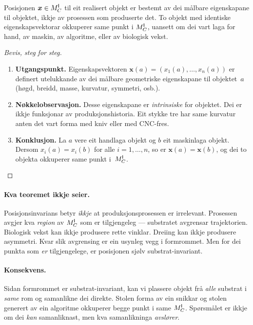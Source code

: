 \begin{satmark}[Posisjonsinvarians]\label{thm:L.7.2}
Posisjonen $\bm{x} \in M^{\mathsf{I}}_C$ til eit realisert objekt er bestemt
av dei målbare eigenskapane til objektet, ikkje av prosessen som
produserte det. To objekt med identiske eigenskapsvektorar
okkuperer same punkt i $M^{\mathsf{I}}_C$, uansett om dei vart laga for hand,
av maskin, av algoritme, eller av biologisk vekst.
\end{satmark}

\begin{proof}[Bevis, steg for steg]
\begin{enumerate}
  \item \textbf{Utgangspunkt.}\;
    Eigenskapsvektoren $\bm{x}(a) = (x_1(a), \ldots, x_n(a))$ er
    definert utelukkande av dei målbare geometriske eigenskapane
    til objektet~$a$ (høgd, breidd, masse, kurvatur, symmetri, osb.).
  \item \textbf{Nøkkelobservasjon.}\;
    Desse eigenskapane er \emph{intrinsiske} for objektet. Dei er
    ikkje funksjonar av produksjonshistoria. Eit stykke tre har
    same kurvatur anten det vart forma med kniv eller med
    CNC-fres.
  \item \textbf{Konklusjon.}\;
    La $a$ vere eit handlaga objekt og $b$ eit maskinlaga objekt.
    Dersom $x_i(a) = x_i(b)$ for alle $i = 1, \ldots, n$, so er
    $\bm{x}(a) = \bm{x}(b)$, og dei to objekta okkuperer same
    punkt i~$M^{\mathsf{I}}_C$. \qedhere
\end{enumerate}
\end{proof}

\paragraph{Kva teoremet ikkje seier.}
Posisjonsinvarians betyr \emph{ikkje} at produksjonsprosessen er
irrelevant. Prosessen avgjer kva \emph{region} av $M^{\mathsf{I}}_C$ som er
tilgjengeleg --- substratet avgrensar trajektorien. Biologisk vekst
kan ikkje produsere rette vinklar. Dreiing kan ikkje produsere
asymmetri. Kvar slik avgrensing er ein usynleg vegg i formrommet.
Men for dei punkta som \emph{er} tilgjengelege, er posisjonen
sjølv substrat-invariant.

\paragraph{Konsekvens.}
Sidan formrommet er substrat-invariant, kan vi plassere objekt frå
\emph{alle} substrat i \emph{same} rom og samanlikne dei direkte.
Stolen forma av ein snikkar og stolen generert av ein algoritme
okkuperer begge punkt i same $M^{\mathsf{I}}_C$. Spørsmålet er ikkje om dei
\emph{kan} samanliknast, men kva samanlikninga \emph{avslører}.


